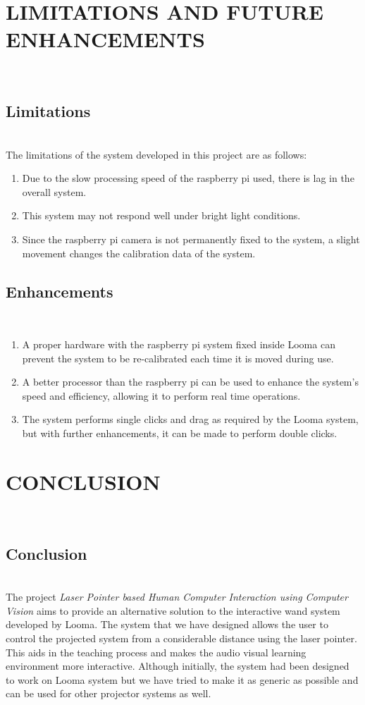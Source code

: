 \documentclass[12pt, a4paper]{article}
\begin{document}
\section{LIMITATIONS AND FUTURE ENHANCEMENTS}
~\\
\subsection{Limitations}
~\\
The limitations of the system developed in this project are as follows:

\begin{enumerate}
\item Due to the slow processing speed of the raspberry pi used, there is lag in the overall system. 
\item This system may not respond well under bright light conditions.
\item Since the raspberry pi camera is not permanently fixed to the system, a slight movement changes the calibration data of the system.

\end{enumerate}

\subsection{Enhancements}
~\\
\begin{enumerate}
\item A proper hardware with the raspberry pi system fixed inside Looma can prevent the system to be re-calibrated each time it is moved during use.
\item A better processor than the raspberry pi can be used to enhance the system’s speed and efficiency, allowing it to perform real time operations.
\item The system performs single clicks and drag as required by the Looma system, but with further enhancements, it can be made to perform double clicks.
\end{enumerate}
\newpage
\section{CONCLUSION}
~\\
\subsection{Conclusion}
~\\
The project \emph{Laser Pointer based Human Computer Interaction using Computer Vision} aims to provide an alternative solution to the interactive wand system developed by Looma. The system that we have designed allows the user to control the projected system from a considerable distance using the laser pointer. This aids in the teaching process and makes the audio visual learning environment more interactive. Although initially, the system had been designed to work on Looma system but we have tried to make it as generic as possible and can be used for other projector systems as well. 
\end{document}

